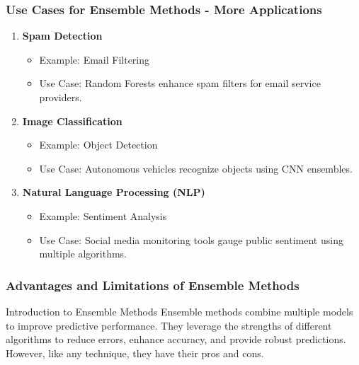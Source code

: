 \documentclass[aspectratio=169]{beamer}
\begin{document}
\begin{frame}[fragile]
  \frametitle{Use Cases for Ensemble Methods - More Applications}
  \begin{enumerate}[resume]
    \item \textbf{Spam Detection}
      \begin{itemize}
        \item Example: Email Filtering
        \item Use Case: Random Forests enhance spam filters for email service providers.
      \end{itemize}
    \item \textbf{Image Classification}
      \begin{itemize}
        \item Example: Object Detection
        \item Use Case: Autonomous vehicles recognize objects using CNN ensembles.
      \end{itemize}
    \item \textbf{Natural Language Processing (NLP)}
      \begin{itemize}
        \item Example: Sentiment Analysis
        \item Use Case: Social media monitoring tools gauge public sentiment using multiple algorithms.
      \end{itemize}
  \end{enumerate}
\end{frame}

\begin{frame}[fragile]
    \frametitle{Advantages and Limitations of Ensemble Methods}
    \begin{block}{Introduction to Ensemble Methods}
        Ensemble methods combine multiple models to improve predictive performance. They leverage the strengths of different algorithms to reduce errors, enhance accuracy, and provide robust predictions. However, like any technique, they have their pros and cons.
    \end{block}
\end{frame}
\end{document}
